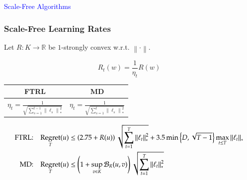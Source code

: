 \documentclass[usenames,dvipsnames]{beamer}
\DeclareMathOperator{\Regret}{Regret}
\newcommand{\R}{\mathbb{R}}
\newcommand{\norm}[1]{\left\|#1\right\|}
\newcommand{\Breg}{\mathcal{B}}
\begin{document}
\begin{frame}
\centering
\Huge
\textcolor{Blue}{Scale-Free Algorithms}
\end{frame}



\begin{frame}
\frametitle{Scale-Free Learning Rates}
Let $R:K \to \R$ be $1$-strongly convex w.r.t. $\norm{\cdot}$.

\vspace{0.2cm}

\begin{minipage}{4cm}
$$
R_t(w) = \frac{1}{\eta_t} R(w)
$$
\end{minipage}
%
\begin{minipage}{5cm}
\begin{center}
\def\arraystretch{2}%
\everymath{\displaystyle}
\begin{tabular}{c|c}
FTRL & MD \\ \hline
$\eta_t = \frac{1}{\sqrt{\sum_{s=1}^{t-1} \norm{\ell_s}_*^2}}$ &  $\eta_t = \frac{1}{\sqrt{\sum_{s=1}^t \norm{\ell_s}_*^2}}$ \\
\end{tabular}
\end{center}
\end{minipage}

\pause

\vspace{0.5cm}

\begin{center}
\fontsize{9pt}{10}\selectfont
\begin{align*}
\textsc{FTRL:} & & \Regret_T(u) & \le \left(2.75 + R(u)\right) \sqrt{\sum_{t=1}^T \norm{\ell_t}_*^2} + 3.5 \min \left\{ D, \sqrt{T-1} \right\} \max_{t \le T} \norm{\ell_t}_* \\
\textsc{MD:} & & \Regret_T(u) & \le \left(1 + \sup_{v \in K} \Breg_{R}(u,v) \right) \sqrt{\sum_{t=1}^T \norm{\ell_t}_*^2}
\end{align*}
\end{center}



\end{frame}
\end{document}
